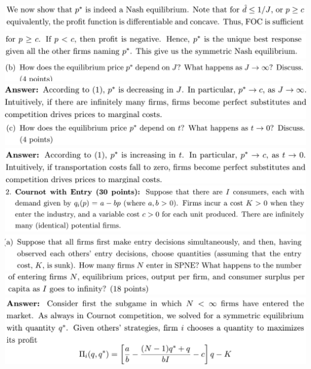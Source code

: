 \documentclass[8pt,landscape]{extarticle}
\begin{document}
\begin{multicols*}{3}
    \includegraphics[width=0.71\linewidth,keepaspectratio]{Screenshots/Screenshot 2024-03-11 171405.png}
    \includegraphics[width=0.71\linewidth,keepaspectratio]{Screenshots/Screenshot 2024-03-11 171410.png}
    \includegraphics[width=0.74\linewidth,keepaspectratio]{Screenshots/Screenshot 2024-03-11 171415.png}
    \includegraphics[width=0.7\linewidth,keepaspectratio]{Screenshots/Screenshot 2024-03-11 171420.png}
    \includegraphics[width=0.74\linewidth,keepaspectratio]{Screenshots/Screenshot 2024-03-11 171427.png}
    \includegraphics[width=0.7\linewidth,keepaspectratio]{Screenshots/Screenshot 2024-03-11 171431.png}
    \includegraphics[width=0.77\linewidth,keepaspectratio]{Screenshots/Screenshot 2024-03-11 171607.png}
    \includegraphics[width=0.74\linewidth,keepaspectratio]{Screenshots/Screenshot 2024-03-11 171614.png}
    \includegraphics[width=0.71\linewidth,keepaspectratio]{Screenshots/Screenshot 2024-03-11 171620.png}
    \includegraphics[width=0.71\linewidth,keepaspectratio]{Screenshots/Screenshot 2024-03-11 171631.png}

\end{multicols*}
\end{document}
